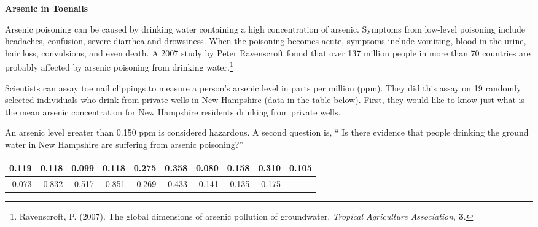 \def\theTopic{Arsenic}
\def\dayNum{16 }

\begin{center}
{\bf {\large Arsenic in Toenails}}
\end{center}

Arsenic poisoning can be caused by drinking water containing
a high concentration of arsenic.  Symptoms from
low-level poisoning include headaches, confusion, severe diarrhea and
drowsiness.  When the poisoning becomes acute, symptoms include
vomiting, blood in the urine, hair loss, convulsions, and even death.
A 2007 study by Peter Ravenscroft found that over 137 million people
in more than 70 countries are probably affected by arsenic poisoning
from drinking water.\footnote{Ravenscroft, P. (2007). The global
  dimensions of arsenic pollution of groundwater. {\em Tropical
    Agriculture Association}, {\bf 3}.}

Scientists can assay toe nail clippings to measure a person's arsenic
level in parts per million (ppm).  They did this assay on 19 randomly selected 
individuals who drink from private wells in New Hampshire (data in the
table below). First, they would like to know just what is the mean arsenic 
concentration for New Hampshire residents drinking from private wells.

 An arsenic level greater than 0.150 ppm is considered
hazardous. A second question is, `` Is there evidence that people
drinking the ground water in New Hampshire are suffering from arsenic
poisoning?''



\begin{center}
\begin{tabular}{|r|r|r|r|r|r|r|r|r|r|} \hline
0.119& 0.118& 0.099& 0.118& 0.275& 0.358& 0.080& 0.158& 0.310& 0.105
\\ \hline
0.073& 0.832& 0.517& 0.851& 0.269& 0.433& 0.141& 0.135& 0.175 & \\ \hline
\end{tabular}  
\end{center}


